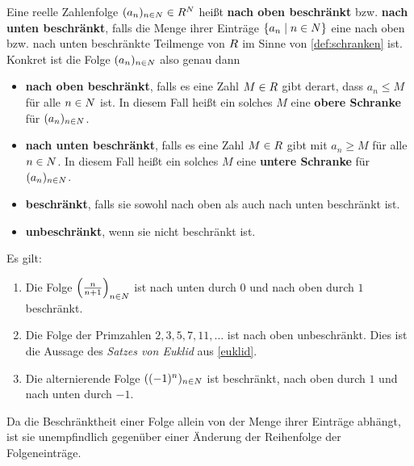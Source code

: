 \begin{defin}[Beschränktheit] 
    Eine reelle Zahlenfolge $(a_n)_{n\in \relax N}\in \relax R^\relax N$ heißt \textbf{nach oben beschränkt} bzw. \textbf{nach unten beschränkt}, falls die Menge ihrer Einträge $\{a_n\mid n\in \relax N\}$ eine nach oben bzw. nach unten beschränkte Teilmenge von $\relax R$ im Sinne von \cref{def:schranken} ist. Konkret ist die Folge $(a_n)_{n\in \relax N}$ also genau dann
    \begin{itemize}
        \item \textbf{nach oben beschränkt}, falls es eine Zahl $M\in \relax R$ gibt derart, dass $a_n\le M$ für alle $n\in \relax N$ ist. In diesem Fall heißt ein solches $M$ eine \textbf{obere Schranke} für $(a_n)_{n\in \relax N}$.
        \item \textbf{nach unten beschränkt}, falls es eine Zahl $M\in \relax R$ gibt mit $a_n\ge M$ für alle $n\in \relax N$. In diesem Fall heißt ein solches $M$ eine \textbf{untere Schranke} für $(a_n)_{n\in \relax N}$.
        \item \textbf{beschränkt}, falls sie sowohl nach oben als auch nach unten beschränkt ist.
        \item \textbf{unbeschränkt}, wenn sie nicht beschränkt ist.
    \end{itemize}
\end{defin}


\begin{bsp} Es gilt:
    \begin{enumerate}
        \item Die Folge $\left(\frac{n}{n+1}\right)_{n\in \relax N}$ ist nach unten durch $0$ und nach oben durch $1$ beschränkt.
        \item Die Folge der Primzahlen $2,3,5,7,11,\dots$ ist nach oben unbeschränkt. Dies ist die Aussage des \emph{Satzes von Euklid} aus \cref{euklid}.
        \item Die alternierende Folge $((-1)^n)_{n\in \relax N}$ ist beschränkt, nach oben durch $1$ und nach unten durch $-1$.
    \end{enumerate}
    Da die Beschränktheit einer Folge allein von der Menge ihrer Einträge abhängt, ist sie unempfindlich gegenüber einer Änderung der Reihenfolge der Folgeneinträge.
\end{bsp}


